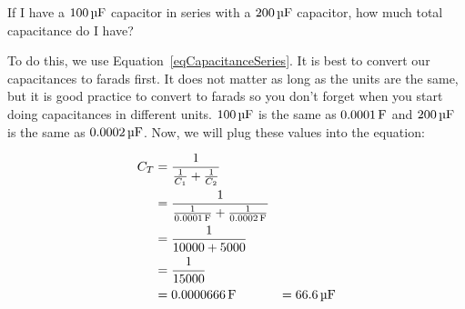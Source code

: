 \begin{exampleprob}
If I have a $100\,\si{\micro\farad}$ capacitor in series with a $200\,\si{\micro\farad}$ capacitor, how much total capacitance do I have?

To do this, we use Equation~\ref{eqCapacitanceSeries}.
It is best to convert our capacitances to farads first.
It does not matter as long as the units are the same, but it is good practice to convert to farads so you don't forget when you start doing capacitances in different units.
$100\,\si{\micro\farad}$ is the same as $0.0001\,\si{\farad}$ and $200\,\si{\micro\farad}$ is the same as $0.0002\,\si{\micro\farad}$.
Now, we will plug these values into the equation:

\begin{align*}
C_T &= \frac{1}{\frac{1}{C_1} + \frac{1}{C_2}} \\
    &= \frac{1}{\frac{1}{0.0001\,\si{\farad}} + \frac{1}{0.0002\,\si{\farad}}} \\
    &= \frac{1}{10000 + 5000} \\
    &= \frac{1}{15000} \\
    &= 0.0000666\,\si{\farad}
    &= 66.6\,\si{\micro\farad}
\end{align*}
\end{exampleprob}

